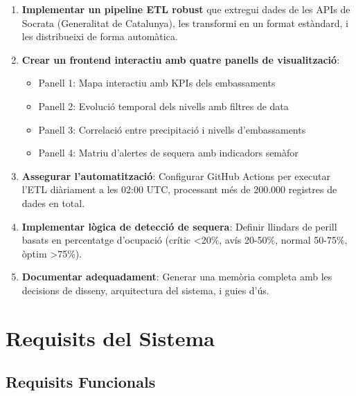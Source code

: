 \documentclass[11pt, a4paper]{article}
\begin{document}
\begin{enumerate}[leftmargin=*]
    \item \textbf{Implementar un pipeline ETL robust} que extregui dades de les APIs de Socrata (Generalitat de Catalunya), les transformi en un format estàndard, i les distribueixi de forma automàtica.

    \item \textbf{Crear un frontend interactiu amb quatre panells de visualització}:
    \begin{itemize}
        \item Panell 1: Mapa interactiu amb KPIs dels embassaments
        \item Panell 2: Evolució temporal dels nivells amb filtres de data
        \item Panell 3: Correlació entre precipitació i nivells d'embassaments
        \item Panell 4: Matriu d'alertes de sequera amb indicadors semàfor
    \end{itemize}

    \item \textbf{Assegurar l'automatització}: Configurar GitHub Actions per executar l'ETL diàriament a les 02:00 UTC, processant més de 200.000 registres de dades en total.

    \item \textbf{Implementar lògica de detecció de sequera}: Definir llindars de perill basats en percentatge d'ocupació (crític \textless20\%, avís 20-50\%, normal 50-75\%, òptim \textgreater75\%).

    \item \textbf{Documentar adequadament}: Generar una memòria completa amb les decisions de disseny, arquitectura del sistema, i guies d'ús.
\end{enumerate}


\section{Requisits del Sistema}

\subsection{Requisits Funcionals}
\end{document}
